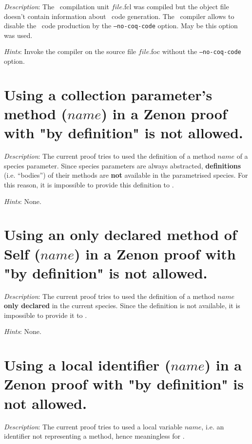 {\em Description}: The \focal\ compilation unit $file$.fcl was
compiled but the object file doesn't contain information about \coq\
code generation. The \focal\ compiler allows to disable the \coq\ code
production by the {\tt --no-coq-code} option. May be this option was
used.

{\em Hints}: Invoke the compiler on the source file $file$.foc without
the {\tt --no-coq-code} option.



\section*{Using a collection parameter's method ($name$) in a Zenon proof
  with "by definition" is not allowed.}

{\em Description}: The current proof tries to used the definition of a
method $name$ of a species parameter. Since species parameters are
always abstracted, {\bf definitions} (i.e. ``bodies'') of their methods
are {\bf not} available in the parametrised species. For this reason,
it is impossible to provide this definition to \zenon.

{\em Hints}: None.



\section*{Using an only declared method of Self ($name$) in a Zenon
  proof with "by definition" is not allowed.}

{\em Description}: The current proof tries to used the definition of a
method $name$ {\bf only declared} in the current species. Since the
definition is not available, it is impossible to provide it to
\zenon.

{\em Hints}: None.



\section*{Using a local identifier ($name$) in a Zenon proof with "by
  definition" is not allowed.}

{\em Description}: The current proof tries to used a local variable
$name$, i.e. an identifier not representing a method, hence
meaningless for \zenon.

